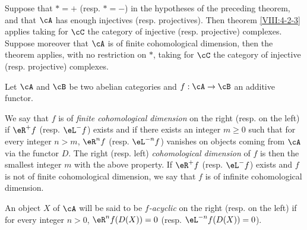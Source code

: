 \begin{corollary}\label{VIII:4-2-3-1} %
Suppose that $\ast=+$ (resp. $\ast=-$) in the hypotheses of the preceding
theorem, and that $\cA$ has enough injectives (resp.
projectives). Then theorem \ref{VIII:4-2-3} applies taking for
$\cC$ the category of injective (resp. projective) complexes. Suppose moreover
that $\cA$ is of finite cohomological dimension, then the theorem
applies, with no restriction on $\ast$, taking for $\cC$ the category
of injective (resp. projective) complexes. 
\end{corollary}





\begin{definition}\label{VIII:4-2-5} %
Let $\cA$ and $\cB$ be two abelian categories and $f:\cA\to \cB$ an
additive functor.

We say that $f$ is of \emph{finite cohomological dimension} on the right (resp.
on the left) if $\eR^+ f$ (resp. $\eL^- f$) exists and if there exists an integer
$m\geqslant 0$ such that for every integer $n>m$, $\eR^n f$ (resp.
$\eL^{-n} f$) vanishes on objects coming from $\cA$ via the functor $D$.
The right (resp. left) \emph{cohomological dimension} of $f$ is
then the smallest integer $m$ with the above property. If
$\eR^+ f$ (resp. $\eL^- f$) exists and $f$ is not of finite
cohomological dimension, we say that $f$ is of infinite cohomological dimension.

An object $X$ of $\cA$ will be said to be \emph{$f$-acyclic} on the right (resp. on the
left) if for every integer $n>0$, $\eR^n f(D(X)) = 0$ (resp.
$\eL^{-n} f(D(X))=0$). 
\end{definition}






